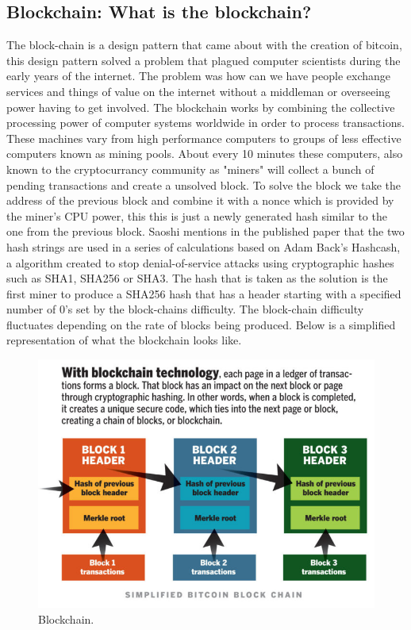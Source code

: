 \subsection{Blockchain: What is the blockchain?}
The block-chain is a design pattern that came about with the creation of bitcoin, this design pattern solved a problem that plagued computer scientists during the early years of the internet. The problem was how can we have people exchange services and things of value on the internet without a middleman or overseeing power having to get involved. The blockchain works by combining the collective processing power of computer systems worldwide in order to process transactions. These machines vary from high performance computers to groups of less effective computers known as mining pools. About every 10 minutes these computers, also known to the cryptocurrancy community as "miners" will collect a bunch of pending transactions and create a unsolved block. To solve the block we take the address of the previous block and combine it with a nonce which is provided by the miner’s CPU power, this this is just a newly generated hash similar to the one from the previous block. Saoshi mentions in the published paper that the two hash strings are used in a series of calculations based on Adam Back's Hashcash, a algorithm created to stop denial-of-service attacks using cryptographic hashes such as SHA1, SHA256 or SHA3. The hash that is taken as the solution is the first miner to produce a SHA256 hash that has a header starting with a specified number of 0’s set by the block-chains difficulty.  The block-chain difficulty fluctuates depending on the rate of blocks being produced. Below is a simplified representation of what the blockchain looks like.\cite{WhatisBl28}
\begin{figure}[H]
\centering
\includegraphics[scale=0.5]{img/blockchaindesign.jpg}
\caption{Blockchain.}
\end{figure}
